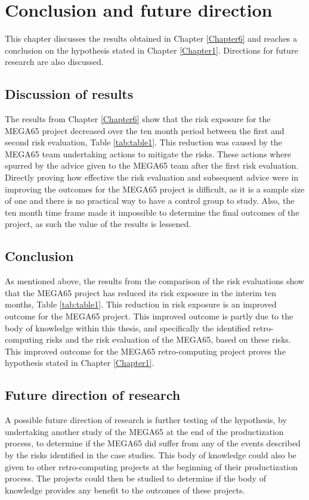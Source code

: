 
\chapter{Conclusion and future direction}
\label{Chapter7}
This chapter discusses the results obtained in Chapter \ref{Chapter6} and reaches a conclusion on the hypothesis stated in Chapter \ref{Chapter1}. Directions for future research are also discussed.

\section{Discussion of results}
The results from Chapter \ref{Chapter6} show that the risk exposure for the MEGA65 project decreased over the ten month period between the first and second risk evaluation, Table \ref{tab:table1}. This reduction was caused by the MEGA65 team undertaking actions to mitigate the risks. These actions where spurred by the advice given to the MEGA65 team after the first risk evaluation. Directly proving how effective the risk evaluation and subsequent advice were in improving the outcomes for the MEGA65 project is difficult, as it is a sample size of one and there is no practical way to have a control group to study. Also, the ten month time frame made it impossible to determine the final outcomes of the project, as such the value of the results is lessened.

\section{Conclusion}
As mentioned above, the results from the comparison of the risk evaluations show that the MEGA65 project has reduced its risk exposure in the interim ten months, Table \ref{tab:table1}. This reduction in risk exposure is an improved outcome for the MEGA65 project. This improved outcome is partly due to the body of knowledge within this thesis, and specifically the identified retro-computing risks and the risk evaluation of the MEGA65, based on these risks. This improved outcome for the MEGA65 retro-computing project proves the hypothesis stated in Chapter \ref{Chapter1}.

\section{Future direction of research}
A possible future direction of research is further testing of the hypothesis, by undertaking another study of the MEGA65 at the end of the productization process, to determine if the MEGA65 did suffer from any of the events described by the risks identified in the case studies. This body of knowledge could also be given to other retro-computing projects at the beginning of their productization process. The projects could then be studied to determine if the body of knowledge provides any benefit to the outcomes of these projects.

